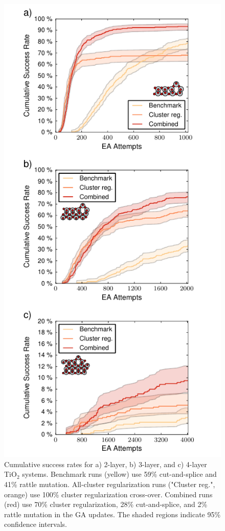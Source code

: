 \documentclass[aip,amsmath,amssymb,reprint]{revtex4-1}
\begin{document}
\begin{figure}[!tb]
    \centering
    \includegraphics[width=1.0\columnwidth]{fig7-success.pdf}
    \caption{Cumulative success rates for a) 2-layer, b) 3-layer, and
      c) 4-layer TiO$_2$ systems. Benchmark runs (yellow) use 59\%
      cut-and-splice and 41\% rattle mutation. All-cluster
      regularization runs ("Cluster reg.", orange) use 100\% cluster
      regularization cross-over. Combined runs (red) use 70\% cluster
      regularization, 28\% cut-and-splice, and 2\% rattle mutation in
      the GA updates. The shaded regions indicate 95\% confidence intervals.}
    \label{fig_success}
\end{figure}
\end{document}
